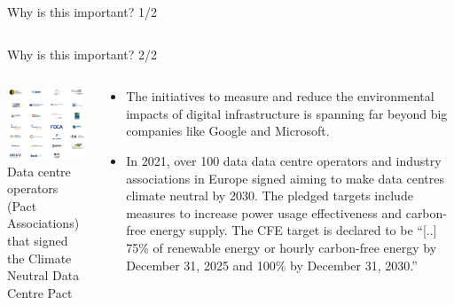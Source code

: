 \begin{frame}{Why is this important? 1/2}
{\begin{columns}[T]
    \end{columns}

  }
\end{frame}


\begin{frame}{Why is this important? 2/2}

  {\footnotesize

  \begin{columns}[T]

    \begin{column}{6cm}
      \centering
      \vspace{.5cm}
      \includegraphics[width=6cm]{images/climateneutraldatacentre.png}
      {\scriptsize
      Data centre operators (Pact Associations) that signed \\ 
      the Climate Neutral Data Centre Pact}
    \end{column}

    \begin{column}{9cm}

      \begin{itemize}
        \item  The initiatives to measure and reduce the environmental impacts of digital infrastructure is spanning far beyond big companies like Google and  Microsoft.
        
        \item In 2021, over 100 data data centre operators and industry associations in Europe signed  aiming to make data centres climate neutral by 2030. The pledged targets include measures to increase power usage effectiveness and carbon-free energy supply. The CFE target is declared to be \enquote{[..] 75\% of renewable energy or hourly carbon-free energy by December 31, 2025 and 100\% by December 31, 2030.} 


\end{itemize}
\end{column}
\end{columns}}
\end{frame}
